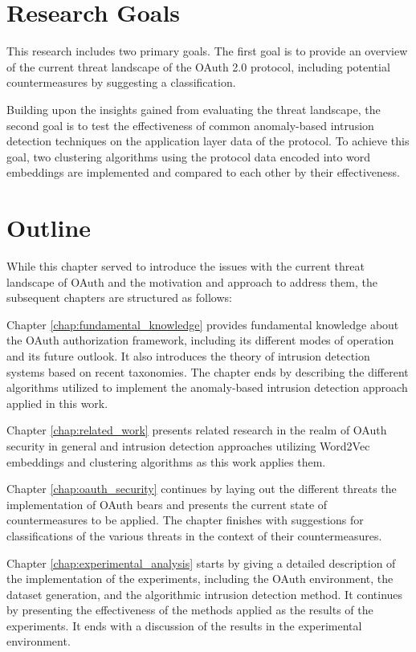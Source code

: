 \documentclass[
    fontsize=12pt,
    headings=small,
    parskip=half,           %
    bibliography=totoc,
    numbers=noenddot,       %
    open=any,               %
    ]{scrreprt}
\begin{document}
\section{Research Goals}
This research includes two primary goals. The first goal is to provide an overview of the current threat landscape of the OAuth 2.0 protocol, including potential countermeasures by suggesting a classification. 

Building upon the insights gained from evaluating the threat landscape, the second goal is to test the effectiveness of common anomaly-based intrusion detection techniques on the application layer data of the protocol. To achieve this goal, two clustering algorithms using the protocol data encoded into word embeddings are implemented and compared to each other by their effectiveness.


\section{Outline}
While this chapter served to introduce the issues with the current threat landscape of OAuth and the motivation and approach to address them, the subsequent chapters are structured as follows:

Chapter \ref{chap:fundamental_knowledge} provides fundamental knowledge about the OAuth authorization framework, including its different modes of operation and its future outlook. It also introduces the theory of intrusion detection systems based on recent taxonomies. The chapter ends by describing the different algorithms utilized to implement the anomaly-based intrusion detection approach applied in this work. 

Chapter \ref{chap:related_work} presents related research in the realm of OAuth security in general and intrusion detection approaches utilizing Word2Vec embeddings and clustering algorithms as this work applies them.

Chapter \ref{chap:oauth_security} continues by laying out the different threats the implementation of OAuth bears and presents the current state of countermeasures to be applied. The chapter finishes with suggestions for classifications of the various threats in the context of their countermeasures.

Chapter \ref{chap:experimental_analysis} starts by giving a detailed description of the implementation of the experiments, including the OAuth environment, the dataset generation, and the algorithmic intrusion detection method. It continues by presenting the effectiveness of the methods applied as the results of the experiments. It ends with a discussion of the results in the experimental environment.
\end{document}
